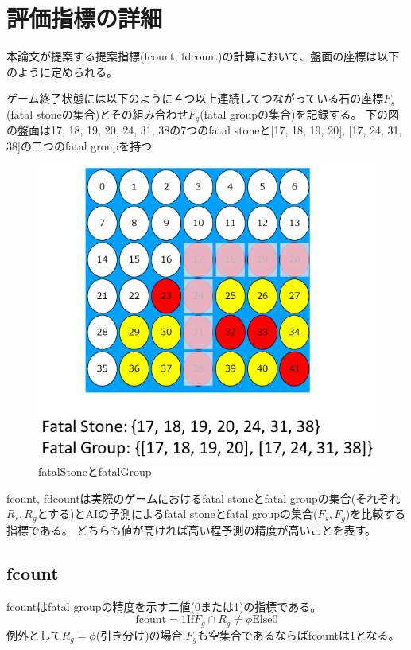 \section{評価指標の詳細}
本論文が提案する提案指標(fcount, fdcount)の計算において、盤面の座標は以下のように定められる。

ゲーム終了状態には以下のように４つ以上連続してつながっている石の座標$F_s$(fatal stoneの集合)とその組み合わせ$F_g$(fatal groupの集合)を記録する。
下の図の盤面は{17, 18, 19, 20, 24, 31, 38}の7つのfatal stoneと{[17, 18, 19, 20], [17, 24, 31, 38]}の二つのfatal groupを持つ
\begin{figure}[t]
	\centering
	\includegraphics[width=\linewidth]{./figure/fatalGroup.png}
	\caption{fatalStoneとfatalGroup}
	\label{fig:fatalGroup}
\end{figure}
fcount, fdcountは実際のゲームにおけるfatal stoneとfatal groupの集合(それぞれ$R_s, R_g$とする)とAIの予測によるfatal stoneとfatal groupの集合($F_s, F_g$)を比較する指標である。
どちらも値が高ければ高い程予測の精度が高いことを表す。
\subsection{fcount}
fcountはfatal groupの精度を示す二値(0または1)の指標である。
\begin{equation}
	{\textrm{fcount} = 1 \textrm{If} F_g \cap R_g \ne \phi \textrm{Else} 0}
\end{equation}
例外として$R_g=\phi$(引き分け)の場合,$F_g$も空集合であるならばfcountは1となる。
